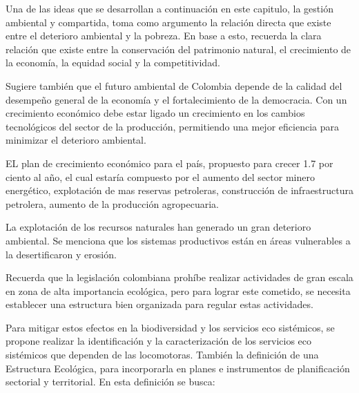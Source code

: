 \documentclass[journal]{./oldtran/IEEEtran}
\begin{document}
Una de las ideas que se desarrollan a continuación en este capitulo, la gestión ambiental y compartida, toma como argumento la relación directa que existe entre el deterioro ambiental y la pobreza. En base a esto, recuerda la clara relación que existe entre la conservación del patrimonio natural, el crecimiento de la economía, la equidad social y la competitividad.


Sugiere también que el futuro ambiental de Colombia depende de la calidad del desempeño general de la economía y el fortalecimiento de la democracia. Con un crecimiento económico debe estar ligado un crecimiento en los cambios tecnológicos del sector de la producción, permitiendo una mejor eficiencia para minimizar el deterioro ambiental.

EL plan de crecimiento económico para el país, propuesto para crecer 1.7 por ciento al año, el cual estaría compuesto por el aumento del sector minero energético, explotación de mas reservas petroleras, construcción de infraestructura petrolera, aumento de la producción agropecuaria.

La explotación de los recursos naturales han generado un gran deterioro ambiental. Se menciona que los sistemas productivos están en áreas vulnerables a la desertificaron y erosión.

Recuerda que la legislación colombiana prohíbe realizar actividades de gran escala en zona de alta importancia ecológica, pero para lograr este cometido, se necesita establecer una estructura bien organizada para regular estas actividades.


Para mitigar estos efectos en la biodiversidad y los servicios eco sistémicos, se propone realizar la identificación y la caracterización de los servicios eco sistémicos que dependen de las locomotoras. También la definición de una Estructura Ecológica, para incorporarla en planes e instrumentos de planificación sectorial y territorial. En esta definición se busca:
\end{document}
